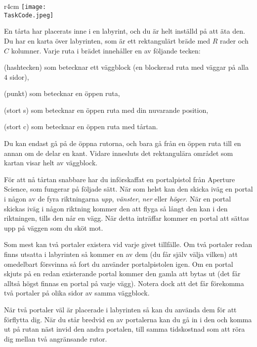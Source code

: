 \documentclass{boi2014-se}
\renewcommand{\TaskCode}{portals}
\newcommand{\constant}[1]{{\tt #1}}
\begin{document}
    \begin{wrapfigure}[4]{r}{4cm}
        \vspace{-41pt}
        \texttt{[image: \\TaskCode.jpeg]}
    \end{wrapfigure}

    En tårta har placerats inne i en labyrint, och du är helt inställd på att äta den.
    Du har en karta över labyrinten, som är ett rektangulärt bräde med $R$ rader och
    $C$ kolumner. Varje ruta i brädet innehåller en av följande tecken:
    \begin{description}[itemindent=1pt]
        \item[\constant{\#}] (hashtecken) som betecknar ett väggblock (en blockerad ruta med väggar på alla $4$ sidor),
        \item[\constant{.}] (punkt) som betecknar en öppen ruta,
        \item[\constant{S}] (stort s) som betecknar en öppen ruta med din nuvarande position,
        \item[\constant{C}] (stort c) som betecknar en öppen ruta med tårtan.
    \end{description}

    Du kan endast gå på de öppna rutorna, och bara gå från en öppen ruta till en annan
    om de delar en kant. Vidare innesluts det rektangulära området som kartan visar
    helt av väggblock.

    För att nå tårtan snabbare har du införskaffat en portalpistol från
    Aperture Science\texttrademark{}, som fungerar på följade sätt.
    När som helst kan den skicka iväg en portal i någon av de fyra riktningarna
    \emph{upp}, \emph{vänster}, \emph{ner} eller \emph{höger}.
    När en portal skickas iväg i någon riktning kommer den att flyga så långt
    den kan i den riktningen, tills den når en vägg. När detta inträffar kommer
    en portal att sättas upp på väggen som du sköt mot.

    Som mest kan två portaler existera vid varje givet tillfälle. Om två portaler
    redan finns utsatta i labyrinten så kommer en av dem (du får själv välja vilken)
    att omedelbart försvinna så fort du använder portalpistolen igen.
    Om en portal skjuts på en redan existerande portal kommer den gamla att bytas ut
    (det får alltså högst finnas en portal på varje vägg). Notera dock
    att det får förekomma två portaler på olika sidor av samma väggblock.

    När två portaler väl är placerade i labyrinten så kan du använda dem för
    att förflytta dig. När du står bredvid en av portalerna kan du gå in
    i den och komma ut på rutan näst invid den andra portalen, till samma
    tidskostnad som att röra dig mellan två angränsande rutor.
\end{document}
